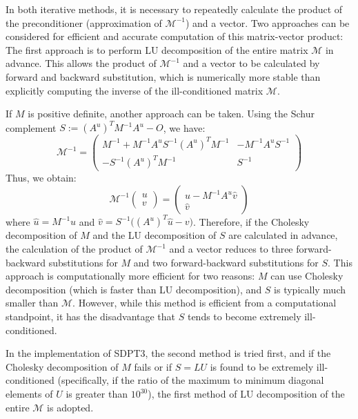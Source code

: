 In both iterative methods, it is necessary to repeatedly calculate the product of the preconditioner (approximation of $\mathcal{M}^{-1}$) and a vector.
Two approaches can be considered for efficient and accurate computation of this matrix-vector product:
The first approach is to perform LU decomposition of the entire matrix $\mathcal{M}$ in advance.
This allows the product of $\mathcal{M}^{-1}$ and a vector to be calculated by forward and backward substitution, which is numerically more stable than explicitly computing the inverse of the ill-conditioned matrix $\mathcal{M}$.

If $M$ is positive definite, another approach can be taken. 
Using the Schur complement $S := (A^u)^T M^{-1} A^u - O$, we have:
\[
\mathcal{M}^{-1}=\begin{pmatrix}
    M^{-1} + M^{-1} A^u S^{-1} (A^u)^T M^{-1} & -M^{-1} A^u S^{-1} \\
    -S^{-1} (A^u)^T M^{-1} & S^{-1}
\end{pmatrix}
\]
Thus, we obtain:
\[
    \mathcal{M}^{-1}\begin{pmatrix}u \\ v \end{pmatrix} = \begin{pmatrix} \hat{u} - M^{-1} A^u \hat{v} \\ \hat{v} \end{pmatrix}
\]
where $\hat{u} = M^{-1} u$ and $\hat{v} = S^{-1}\big((A^u)^T \hat{u} - v \big)$.
Therefore, if the Cholesky decomposition of $M$ and the LU decomposition of $S$ are calculated in advance, the calculation of the product of $\mathcal{M}^{-1}$ and a vector reduces to three forward-backward substitutions for $M$ and two forward-backward substitutions for $S$.
This approach is computationally more efficient for two reasons: $M$ can use Cholesky decomposition (which is faster than LU decomposition), and $S$ is typically much smaller than $\mathcal{M}$.
However, while this method is efficient from a computational standpoint, it has the disadvantage that $S$ tends to become extremely ill-conditioned.

In the implementation of SDPT3, the second method is tried first, and if the Cholesky decomposition of $M$ fails or if $S=LU$ is found to be extremely ill-conditioned (specifically, if the ratio of the maximum to minimum diagonal elements of $U$ is greater than $10^{30}$), the first method of LU decomposition of the entire $\mathcal{M}$ is adopted.

